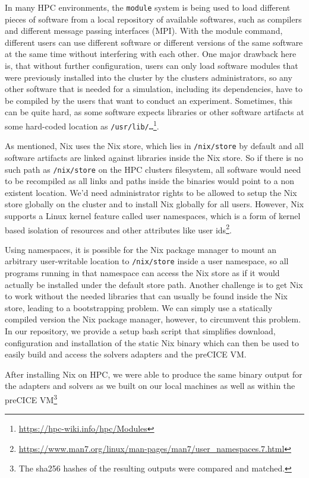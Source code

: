 \documentclass{eceasst}
\begin{document}
In many HPC environments, the \texttt{module} system is being used to load different pieces of software from a local repository of available softwares, such as compilers and different message passing interfaces (MPI).
With the module command, different users can use different software or different versions of the same software at the same time without interfering with each other.
One major drawback here is, that without further configuration, users can only load software modules that were previously installed into the cluster by the clusters administrators, so any other software that is needed for a simulation, including its dependencies, have to be compiled by the users that want to conduct an experiment.
Sometimes, this can be quite hard, as some software expects libraries or other software artifacts at some hard-coded location as \texttt{/usr/lib/\ldots}\footnote{\url{https://hpc-wiki.info/hpc/Modules}}.

As mentioned, Nix uses the Nix store, which lies in \texttt{/nix/store} by default and all software artifacts are linked against libraries inside the Nix store.
So if there is no such path as \texttt{/nix/store} on the HPC clusters filesystem, all software would need to be recompiled as all links and paths inside the binaries would point to a non existent location.
We'd need administrator rights to be allowed to setup the Nix store globally on the cluster and to install Nix globally for all users.
However, Nix supports a Linux kernel feature called user namespaces, which is a form of kernel based isolation of resources and other attributes like user ids\footnote{\url{https://www.man7.org/linux/man-pages/man7/user_namespaces.7.html}}.

Using namespaces, it is possible for the Nix package manager to mount an arbitrary user-writable location to \texttt{/nix/store} inside a user namespace, so all programs running in that namespace can access the Nix store as if it would actually be installed under the default store path.
Another challenge is to get Nix to work without the needed libraries that can usually be found inside the Nix store, leading to a bootstrapping problem.
We can simply use a statically compiled version the Nix package manager, however, to circumvent this problem.
In our repository, we provide a setup bash script that simplifies download, configuration and installation of the static Nix binary which can then be used to easily build and access the solvers adapters and the preCICE VM.

After installing Nix on HPC, we were able to produce the same binary output for the adapters and solvers as we built on our local machines as well as within the preCICE VM\footnote{The sha256 hashes of the resulting outputs were compared and matched.}
\end{document}
